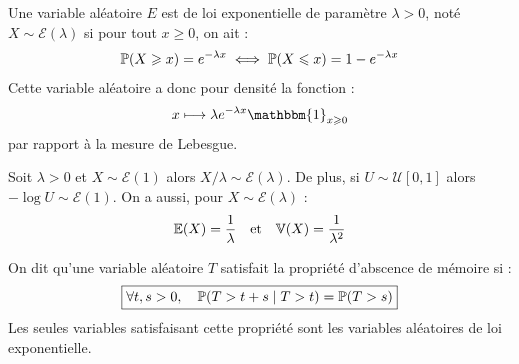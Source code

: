 \begin{rappel}
    Une variable aléatoire $E$ est de loi exponentielle de paramètre $ \lambda > 0$, noté $X \sim \mathcal{E}(\lambda)$ 
    si pour tout $x \geqslant 0$, on ait : 
        \[ \mathbb{P}(X \geqslant x) = e^{- \lambda x} \iff \mathbb{P}(X \leqslant x) = 1 - e^{- \lambda x}  \] 
    Cette variable aléatoire a donc pour densité la fonction : 
        $$ x \longmapsto \lambda e^{- \lambda x} \mathbbm{1}_{x \geqslant 0} $$ 
    par rapport à la mesure de Lebesgue.  
\end{rappel}

\begin{prop}
    Soit $ \lambda> 0$ et $X \sim \mathcal{E}(1)$ alors $ X/ \lambda \sim \mathcal{E}( \lambda)$. 
    De plus, si $U \sim \mathcal{U}[0,1]$ alors $ - \log U \sim \mathcal{E}(1)$. On a aussi, pour 
    $ X \sim \mathcal{E}( \lambda)$ : 
        $$ \mathbb{E}(X) = \frac{1}{ \lambda} \quad \text{et} \quad \mathbb{V}(X) = \frac{1}{ \lambda^2} $$         
\end{prop}

\begin{prop}
    On dit qu'une variable aléatoire $T$ satisfait la propriété d'abscence de mémoire si : 
        $$ \boxed{ \forall t,s > 0, \quad \mathbb{P}(T > t + s \mid T > t) = \mathbb{P}(T > s)  } $$ 
    Les seules variables satisfaisant cette propriété sont les variables aléatoires de loi exponentielle. 
\end{prop}

